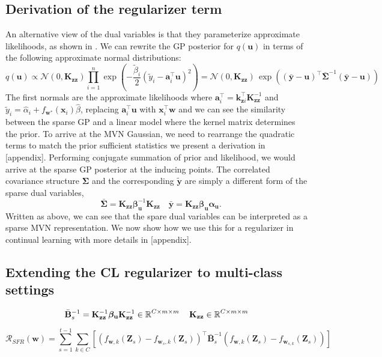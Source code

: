 \documentclass{article}
\newcommand{\mathbold}[1]{\bm{#1}}
\newcommand{\mbf}[1]{\mathbf{#1}}
\newcommand{\MB}{\mbf{B}}
\newcommand{\MZ}{\mbf{Z}}
\newcommand{\T}{\top}
\newcommand{\valpha}[0]{\mathbold{\alpha}}
\newcommand{\vbeta}[0]{\mathbold{\beta}}
\newcommand{\vu}{\mbf{u}}
\newcommand{\vx}{\mbf{x}}
\newcommand{\vy}{\mbf{y}}
\newcommand{\vw}{\mbf{w}}
\newcommand{\va}{\mbf{a}}
\newcommand{\MKzz}{\mbf{K}_{\mbf{z}\mbf{z}}}
\newcommand{\vkzi}{\mbf{k}_{\mbf{z}i}}
\newcommand{\MSigma}[0]{\mathbold{\Sigma}}
\newcommand{\Norm}{\mathcal{N}}
\begin{document}
\subsection{Derivation of the regularizer term}
An alternative view of the dual variables is that they parameterize approximate likelihoods, as shown in \citep{adam2021dual, khan2017conjugate}. We can rewrite the GP posterior for $q(\vu)$ in terms of the following approximate normal distributions:
\begin{equation}
 q(\vu) \propto \Norm(0, \MKzz) \prod_{i=1}^n \exp \! \left(-\frac{\tilde{\beta}_i}{2}(\tilde{y}_i - \va_i^\top \vu)^2 \right) = \Norm(0, \MKzz) \, \exp\left((\bar{\vy} - \vu)^\top \bar{\MSigma}^{-1}(\bar{\vy} - \vu)\right)  
\end{equation}
The first normals are the approximate likelihoods where $\va_i^\top = \vkzi^\top \MKzz^{-1}$ and $\tilde{y}_i = \hat{\alpha}_i + f_{\vw^*}(\vx_i)\hat{\beta}$,  replacing $\va_i^\top \vu$ with $\vx_i^{\top}\vw$ and we can see the similarity between the sparse GP and a linear model where the kernel matrix determines the prior. To arrive at the MVN Gaussian, we need to rearrange the quadratic terms to match the prior sufficient statistics we present a derivation in [appendix]. Performing conjugate summation of prior and likelihood, we would arrive at the sparse GP posterior at the inducing points. The correlated covariance structure $\MSigma$ and the corresponding $\tilde{\vy}$ are simply a different form of the sparse dual variables,
\begin{equation}
\quad \bar{\MSigma} =  \MKzz \vbeta_\vu^{-1} \MKzz \quad \bar{\vy} = \MKzz \vbeta_{\vu}\valpha_{\vu}.
\end{equation}
Written as above, we can see that the spare dual variables can be interpreted as a sparse MVN representation. We now show how we use this for a regularizer in continual learning with more details in [appendix].

\subsection{Extending the CL regularizer to multi-class settings}
\begin{equation}
	\bar{\MB}^{-1}_s = \MKzz^{-1} \vbeta_\vu \MKzz^{-1} \in \R^{C \times m \times m} \quad \MKzz \in \R^{C \times m \times m} 
\end{equation}

\begin{equation}
	\mathcal{R_\textit{SFR}}(\mathbf{w}) = \sum_{s=1}^{t-1}	\sum_{k \in 	C}\left[\left(f_{\vw, k}(\MZ_{s}) - f_{\vw_{s}, k}(\MZ_s) \right)^\T \bar{\MB}^{-1}_{s} \left(f_{\vw, k}(\MZ_{s}) - f_{\vw_{s, k}}(\MZ_s) \right) \right] 
\end{equation}
\end{document}
